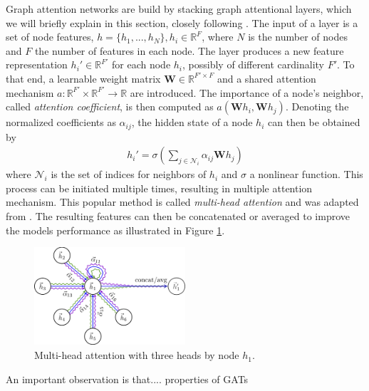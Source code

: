 \label{chapter:GAT Architecture}

Graph attention networks are build by stacking graph attentional layers, which we will briefly explain in this section, closely following \cite{velickovic2018graph}. The input of a layer is a set of node features, $h = \{h_1,...,h_N\}, h_i \in \mathbb{R}^F$, where $N$ is the number of nodes and $F$ the number of features in each node. The layer produces a new feature representation $h_i' \in \mathbb{R}^{F'}$ for each node $h_i$, possibly of different cardinality $F'$. To that end, a learnable weight matrix $\mathbf{W} \in \mathbb{R}^{F' \times F}$ and a shared attention mechanism $a: \mathbb{R}^{F'} \times \mathbb{R}^{F'} \rightarrow \mathbb{R}$ are introduced. The importance of a node's neighbor, called \textit{attention coefficient}, is then computed as $a(\mathbf{W}h_i, \mathbf{W}h_j)$. Denoting the normalized coefficients as $\alpha_{ij}$, the hidden state of a node $h_i$ can then be obtained by
\begin{align*}
    h_i' = \sigma(\sum_{j \in \mathcal{N}_i} \alpha_{ij}\mathbf{W}h_j)
\end{align*}
where $\mathcal{N}_i$ is the set of indices for neighbors of $h_i$ and $\sigma$ a nonlinear function. This process can be initiated multiple times, resulting in multiple attention mechanism. This popular method is called \textit{multi-head attention} and was adapted from \cite{vaswani2017attention}. The resulting features can then be concatenated or averaged to improve the models performance  as illustrated in Figure \ref{fig:multi-head}.\\
\begin{figure}[h]
    \centering
    \includegraphics[width=0.5\textwidth]{multi_head.png}
    \caption{Multi-head attention with three heads by node $h_1$. \cite{velickovic2018graph}}
    \label{fig:multi-head}
\end{figure}

An important observation is that.... properties of GATs